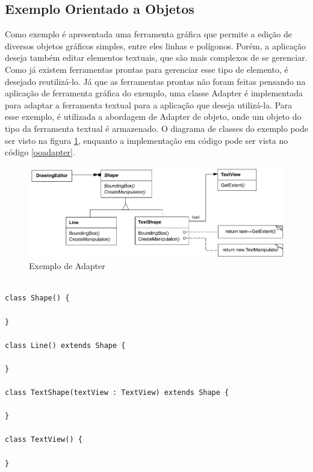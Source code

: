 \subsection*{Exemplo Orientado a Objetos}

Como exemplo é apresentada uma ferramenta gráfica 
que permite a edição de diversos objetos gráficos 
simples, entre eles linhas e polígonos. Porém, 
a aplicação deseja também editar elementos textuais, 
que são mais complexos de se gerenciar. Como já existem 
ferramentas prontas para gerenciar esse tipo de 
elemento, é desejado reutilizá-lo. Já que as 
ferramentas prontas não foram feitas pensando na 
aplicação de ferramenta gráfica do exemplo, uma 
classe Adapter é implementada para adaptar a 
ferramenta textual para a aplicação que deseja 
utilizá-la. Para esse exemplo, é utilizada a 
abordagem de Adapter de objeto, onde um objeto 
do tipo da ferramenta textual é armazenado. O 
diagrama de classes do exemplo pode ser visto na 
figura \ref{adapter_exemplo}, enquanto a 
implementação em código pode ser vista no código 
\ref{ooadapter}.


\begin{figure}[htb]
	\caption{\label{adapter_exemplo}Exemplo de Adapter}
	\begin{center}
	    \includegraphics[scale=0.45]{5_padroes-contexto-funcional/5.2_estruturais/5.2.1_adapter/exemplo_adapter.png}
	\end{center}
\end{figure}


\begin{lstlisting}[caption={Adapter Orientado a Objetos},label=ooadapter]

class Shape() {

}

class Line() extends Shape {

}

class TextShape(textView : TextView) extends Shape {

}

class TextView() {

}


\end{lstlisting}



